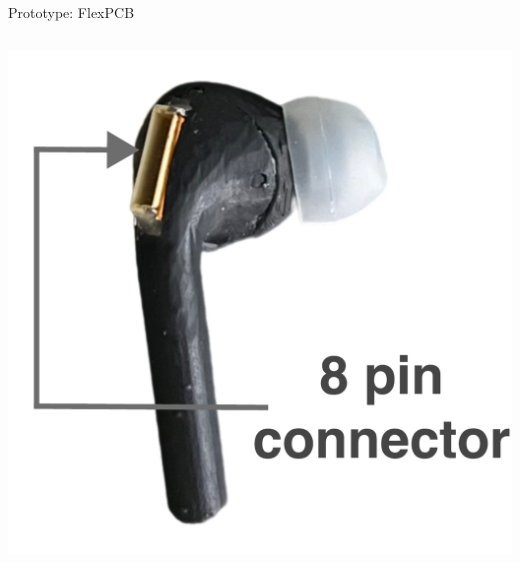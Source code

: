 \documentclass[en]{sdqbeamer}
\begin{document}
    

\begin{frame}{Prototype: FlexPCB}
  \begin{columns}[T]
    \begin{column}{.31\textwidth}
      \includegraphics[width=0.9\linewidth]{../thesis-doc/images/prototype/Earpod_Side1_visual_markers.pdf}
    \end{column}
    

\end{columns}
\end{frame}
\end{document}
